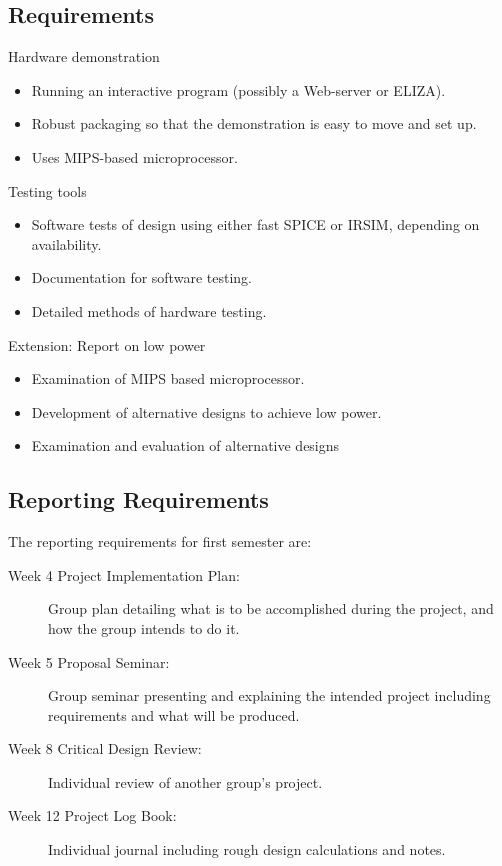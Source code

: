 \subsection{Requirements}
\begin{enumerate}[{[R}1{]}]
\item Hardware demonstration
  \begin{itemize}
  \item Running an interactive program (possibly a Web-server or ELIZA).
  \item Robust packaging so that the demonstration is easy to move and set up.  
  \item Uses MIPS-based microprocessor.
  \end{itemize}

\item Testing tools
  \begin{itemize}
    \item Software tests of design using either fast SPICE or IRSIM, depending on availability.
    \item Documentation for software testing.
    \item Detailed methods of hardware testing.
  \end{itemize}
\item Extension: Report on low power
  \begin{itemize}
  \item Examination of MIPS based microprocessor.
  \item Development of alternative designs to achieve low power.
  \item Examination and evaluation of alternative designs
  \end{itemize}
\end{enumerate}

\subsection{Reporting Requirements}

The reporting requirements for first semester are:
\begin{description}
\item[Week 4 Project Implementation Plan:] Group plan detailing what is to be accomplished during the project, and how the group intends to do it. 
\item[Week 5 Proposal Seminar:] Group seminar presenting and explaining the intended project including requirements and what will be produced.
\item[Week 8 Critical Design Review:] Individual review of another group's project.
\item[Week 12 Project Log Book:] Individual journal including rough design calculations and notes.
\end{description}

